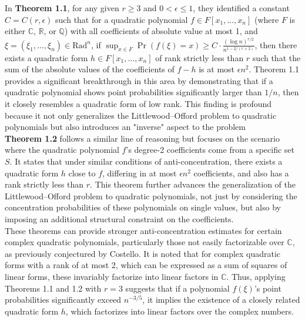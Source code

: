 In \textbf{Theorem 1.1}, for any given $r \geq 3$ and $0 < \epsilon \leq 1$, they identified a constant $C = C(r, \epsilon)$ such that for a quadratic polynomial $f \in F[x_1, \dots, x_n]$ (where $F$ is either $\mathbb{C}$, $\mathbb{R}$, or $\mathbb{Q}$) with all coefficients of absolute value at most 1, and $\xi = (\xi_1, \dots, \xi_n) \in \text{Rad}^n$, if ${\sup_{x \in F} \Pr(f(\xi) = x) \geq C \cdot \frac{(\log n)^{r/2}}{n^{1-2/(r+2)}}}$,
then there exists a quadratic form $h \in F[x_1, \dots, x_n]$ of rank strictly less than $r$ such that the sum of the absolute values of the coefficients of $f - h$ is at most $\epsilon n^2$. Theorem 1.1 provides a significant breakthrough in this area by demonstrating that if a quadratic polynomial shows point probabilities significantly larger than $1/n$, then it closely resembles a quadratic form of low rank. This finding is profound because it not only generalizes the Littlewood–Offord problem to quadratic polynomials but also introduces an "inverse" aspect to the problem\\\newline
\textbf{Theorem 1.2} follows a similar line of reasoning but focuses on the scenario where the quadratic polynomial ${f}$'s degree-2 coefficients come from a specific set $S$. It states that under similar conditions of anti-concentration, there exists a quadratic form $h$ close to ${f}$, differing in at most $\epsilon n^2$ coefficients, and also has a rank strictly less than $r$. This theorem further advances the generalization of the Littlewood–Offord problem to quadratic polynomials, not just by considering the concentration probabilities of these polynomials on single values, but also by imposing an additional structural constraint on the coefficients.\\\newline
These theorems can provide stronger anti-concentration estimates for certain complex quadratic polynomials, particularly those not easily factorizable over $\mathbb{C}$, as previously conjectured by Costello. It is noted that for complex quadratic forms with a rank of at most 2, which can be expressed as a sum of squares of linear forms, these invariably factorize into linear factors in $\mathbb{C}$. Thus, applying Theorems 1.1 and 1.2 with $r = 3$ suggests that if a polynomial $f(\xi)$'s point probabilities significantly exceed $n^{-3/5}$, it implies the existence of a closely related quadratic form $h$, which factorizes into linear factors over the complex numbers.\\\newline

